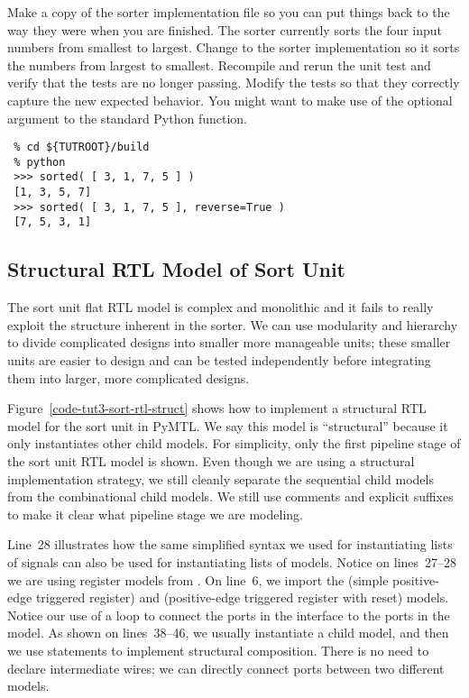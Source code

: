 \documentclass{cbxdoc}
\begin{document}
\newpage

\vspace*{-0.25in}
\begin{task}
  Make a copy of the sorter implementation file so you can put things
  back to the way they were when you are finished. The sorter currently
  sorts the four input numbers from smallest to largest. Change to the
  sorter implementation so it sorts the numbers from largest to smallest.
  Recompile and rerun the unit test and verify that the tests are no
  longer passing. Modify the tests so that they correctly capture the new
  expected behavior. You might want to make use of the optional
   argument to the standard Python  function.

  \begin{verbatim}
 % cd ${TUTROOT}/build
 % python
 >>> sorted( [ 3, 1, 7, 5 ] )
 [1, 3, 5, 7]
 >>> sorted( [ 3, 1, 7, 5 ], reverse=True )
 [7, 5, 3, 1]
  \end{verbatim}
  \vspace{-0.15in}
\end{task}

\subsection{Structural RTL Model of Sort Unit}

The sort unit flat RTL model is complex and monolithic and it fails to
really exploit the structure inherent in the sorter. We can use
modularity and hierarchy to divide complicated designs into smaller more
manageable units; these smaller units are easier to design and can be
tested independently before integrating them into larger, more
complicated designs.



Figure~\ref{code-tut3-sort-rtl-struct} shows how to implement a
structural RTL model for the sort unit in PyMTL. We say this model is
``structural'' because it only instantiates other child models. For
simplicity, only the first pipeline stage of the sort unit RTL model is
shown. Even though we are using a structural implementation strategy, we
still cleanly separate the sequential child models from the combinational
child models. We still use comments and explicit suffixes to make it
clear what pipeline stage we are modeling.

Line~28 illustrates how the same simplified syntax we used for
instantiating lists of signals can also be used for instantiating lists
of models. Notice on lines~27--28 we are using register models from
. On line~6, we import the  (simple positive-edge
triggered register) and  (positive-edge triggered register
with reset) models. Notice our use of a loop to connect the 
ports in the interface to the  ports in the  model. As
shown on lines~38--46, we usually instantiate a child model, and then we
use  statements to implement structural composition. There
is no need to declare intermediate wires; we can directly connect ports
between two different models.
\end{document}
